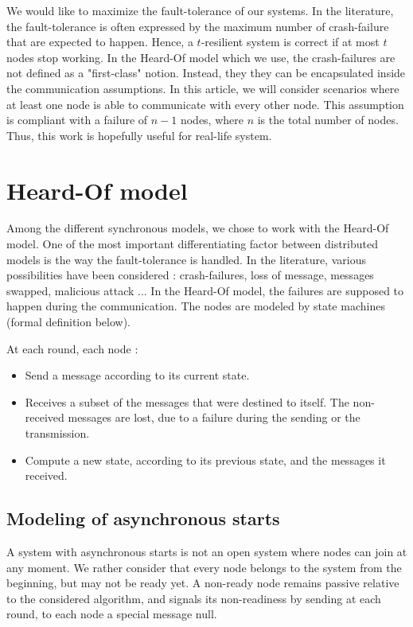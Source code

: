 \documentclass{article}
\begin{document}
We would like to maximize the fault-tolerance of our systems.
In the literature, the fault-tolerance is often expressed by the maximum number of crash-failure that are expected to happen.
Hence, a $t$-resilient system is correct if at most $t$ nodes stop working.
In the Heard-Of model which we use, the crash-failures are not defined as a "first-class" notion.
Instead, they they can be encapsulated inside the communication assumptions.
In this article, we will consider scenarios where at least one node is able to communicate with every other node.
This assumption is compliant with a failure of $n-1$ nodes, where $n$ is the total number of nodes.
Thus, this work is hopefully useful for real-life system.

\section{Heard-Of model}

Among the different synchronous models, we chose to work with the Heard-Of model.
One of the most important differentiating factor between distributed models is the way the fault-tolerance is handled.
In the literature, various possibilities have been considered : crash-failures, loss of message, messages swapped, malicious attack ...
In the Heard-Of model, the failures are supposed to happen during the communication.
The nodes are modeled by state machines (formal definition below).

At each round, each node :
\begin{itemize}
	\item Send a message according to its current state.
	\item Receives a subset of the messages that were destined to itself. The non-received messages are lost, due to a failure during the sending or the transmission.
	\item Compute a new state, according to its previous state, and the messages it received.
\end{itemize}

\subsection{Modeling of asynchronous starts}

A system with asynchronous starts is not an open system where nodes can join at any moment.
We rather consider that every node belongs to the system from the beginning, but may not be ready yet.
A non-ready node remains passive relative to the considered algorithm, and signals its non-readiness by sending at each round, to each node a special message null.
\end{document}
